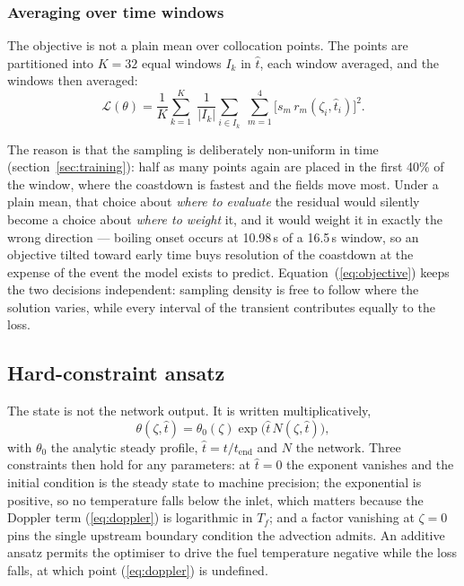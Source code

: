 \documentclass[11pt,a4paper]{article}
\begin{document}
\subsubsection{Averaging over time windows}

The objective is not a plain mean over collocation points. The points are partitioned into
$K = 32$ equal windows $I_k$ in $\hat{t}$, each window averaged, and the windows then
averaged:
\begin{equation}\label{eq:objective}
\mathcal{L}(\theta) = \frac{1}{K}\sum_{k=1}^{K}\;
  \frac{1}{|I_k|}\sum_{i \in I_k}\; \sum_{m=1}^{4}
  \bigl[s_m\,r_m(\zeta_i,\hat{t}_i)\bigr]^2 .
\end{equation}

The reason is that the sampling is deliberately non-uniform in time
(section~\ref{sec:training}): half as many points again are placed in the first 40\% of the
window, where the coastdown is fastest and the fields move most. Under a plain mean, that
choice about \emph{where to evaluate} the residual would silently become a choice about
\emph{where to weight} it, and it would weight it in exactly the wrong direction --- boiling
onset occurs at 10.98\,s of a 16.5\,s window, so an objective tilted toward early time
buys resolution of the coastdown at the expense of the event the model exists to predict.
Equation~(\ref{eq:objective}) keeps the two decisions independent: sampling density is free
to follow where the solution varies, while every interval of the transient contributes
equally to the loss.

\subsection{Hard-constraint ansatz}\label{sec:ansatz}

The state is not the network output. It is written multiplicatively,
\begin{equation}\label{eq:ansatz}
\theta(\zeta,\hat{t}) = \theta_0(\zeta)\exp\bigl(\hat{t}\,N(\zeta,\hat{t})\bigr),
\end{equation}
with $\theta_0$ the analytic steady profile, $\hat{t} = t/t_{\mathrm{end}}$ and $N$ the
network. Three constraints then hold for any parameters: at $\hat{t} = 0$ the exponent
vanishes and the initial condition is the steady state to machine precision; the
exponential is positive, so no temperature falls below the inlet, which matters because the
Doppler term (\ref{eq:doppler}) is logarithmic in $T_f$; and a factor vanishing at
$\zeta = 0$ pins the single upstream boundary condition the advection admits. An additive
ansatz permits the optimiser to drive the fuel temperature negative while the loss falls,
at which point (\ref{eq:doppler}) is undefined.
\end{document}
